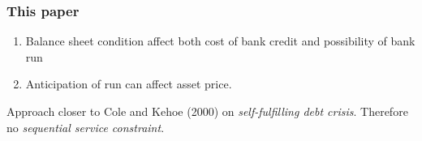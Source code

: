 \begin{frame}
    \frametitle{This paper}

    \begin{enumerate}
        \item Balance sheet condition affect both cost of bank credit and possibility of bank run 
        \item Anticipation of run can affect asset price.
    \end{enumerate}
    
    Approach closer to Cole and Kehoe (2000) on \emph{self-fulfilling debt crisis}. 
    Therefore no \emph{sequential service constraint}. 

\end{frame}

